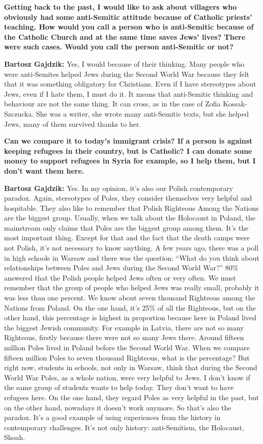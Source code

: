 \textbf{Getting back to the past, I would like to ask about villagers who obviously had some anti-Semitic attitude because of Catholic priests’ teaching. How would you call a person who is anti-Semitic because of the Catholic Church and at the same time saves Jews’ lives? There were such cases. Would you call the person anti-Semitic or not?} 

\textbf{Bartosz Gajdzik:} Yes, I would because of their thinking. Many people who were anti-Semites helped Jews during the Second World War because they felt that it was something obligatory for Christians. Even if I have stereotypes about Jews, even if I hate them, I must do it. It means that anti-Semitic thinking and behaviour are not the same thing. It can cross, as in the case of Zofia Kossak-Szczucka. She was a writer, she wrote many anti-Semitic texts, but she helped Jews, many of them survived thanks to her.  

\textbf{Can we compare it to today’s immigrant crisis? If a person is against keeping refugees in their country, but is Catholic?  I can donate some money to support refugees in Syria for example, so I help them, but I don’t want them here.}  

\textbf{Bartosz Gajdzik:} Yes. In my opinion, it’s also our Polish contemporary paradox. Again, stereotypes of Poles, they consider themselves very helpful and hospitable. They also like to remember that Polish Righteous Among the Nations are the biggest group. Usually, when we talk about the Holocaust in Poland, the mainstream only claims that Poles are the biggest group among them. It’s the most important thing. Except for that and the fact that the death camps were not Polish, it’s not necessary to know anything. A few years ago, there was a poll in high schools in Warsaw and there was the question: ``What do you think about relationships between Poles and Jews during the Second World War?'' 80\% answered that the Polish people helped Jews often or very often. We must remember that the group of people who helped Jews was really small, probably it was less than one percent. We know about seven thousand Righteous among the Nations from Poland. On the one hand, it’s 25\% of all the Righteous, but on the other hand, this percentage is highest in proportion because here in Poland lived the biggest Jewish community. For example in Latvia, there are not so many Righteous, firstly because there were not so many Jews there. Around fifteen million Poles lived in Poland before the Second World War. When we compare fifteen million Poles to seven thousand Righteous, what is the percentage? But right now, students in schools, not only in Warsaw, think that during the Second World War Poles, as a whole nation, were very helpful to Jews. I don’t know if the same group of students wants to help today. They don’t want to have refugees here. On the one hand, they regard Poles as very helpful in the past, but on the other hand, nowadays it doesn’t work anymore. So that’s also the paradox. It’s a good example of using experiences from the history in contemporary challenges. It’s not only history: anti-Semitism, the Holocaust, Shoah.  

